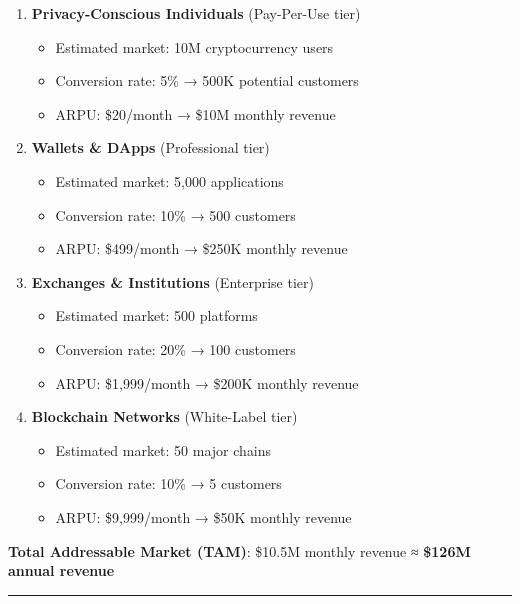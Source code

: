 \documentclass[
  11pt,
]{article}
\providecommand{\tightlist}{%
  \setlength{\itemsep}{0pt}\setlength{\parskip}{0pt}}
\begin{document}
\begin{enumerate}
\def\labelenumi{\arabic{enumi}.}
\tightlist
\item
  \textbf{Privacy-Conscious Individuals} (Pay-Per-Use tier)

  \begin{itemize}
  \tightlist
  \item
    Estimated market: 10M cryptocurrency users
  \item
    Conversion rate: 5\% → 500K potential customers
  \item
    ARPU: \$20/month → \$10M monthly revenue
  \end{itemize}
\item
  \textbf{Wallets \& DApps} (Professional tier)

  \begin{itemize}
  \tightlist
  \item
    Estimated market: 5,000 applications
  \item
    Conversion rate: 10\% → 500 customers
  \item
    ARPU: \$499/month → \$250K monthly revenue
  \end{itemize}
\item
  \textbf{Exchanges \& Institutions} (Enterprise tier)

  \begin{itemize}
  \tightlist
  \item
    Estimated market: 500 platforms
  \item
    Conversion rate: 20\% → 100 customers
  \item
    ARPU: \$1,999/month → \$200K monthly revenue
  \end{itemize}
\item
  \textbf{Blockchain Networks} (White-Label tier)

  \begin{itemize}
  \tightlist
  \item
    Estimated market: 50 major chains
  \item
    Conversion rate: 10\% → 5 customers
  \item
    ARPU: \$9,999/month → \$50K monthly revenue
  \end{itemize}
\end{enumerate}

\textbf{Total Addressable Market (TAM)}: \$10.5M monthly revenue ≈
\textbf{\$126M annual revenue}

\begin{center}\rule{0.5\linewidth}{0.5pt}\end{center}
\end{document}
